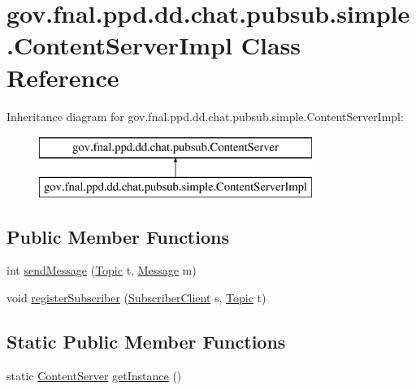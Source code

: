 \hypertarget{classgov_1_1fnal_1_1ppd_1_1dd_1_1chat_1_1pubsub_1_1simple_1_1ContentServerImpl}{\section{gov.\-fnal.\-ppd.\-dd.\-chat.\-pubsub.\-simple.\-Content\-Server\-Impl Class Reference}
\label{classgov_1_1fnal_1_1ppd_1_1dd_1_1chat_1_1pubsub_1_1simple_1_1ContentServerImpl}
}
Inheritance diagram for gov.\-fnal.\-ppd.\-dd.\-chat.\-pubsub.\-simple.\-Content\-Server\-Impl\-:\begin{figure}[H]
\begin{center}
\leavevmode
\includegraphics[height=2.000000cm]{classgov_1_1fnal_1_1ppd_1_1dd_1_1chat_1_1pubsub_1_1simple_1_1ContentServerImpl}
\end{center}
\end{figure}
\subsection*{Public Member Functions}
\begin{DoxyCompactItemize}
\item 
int \hyperlink{classgov_1_1fnal_1_1ppd_1_1dd_1_1chat_1_1pubsub_1_1simple_1_1ContentServerImpl_a8751b4e642ee674d78c127fa0ad41e60}{send\-Message} (\hyperlink{classgov_1_1fnal_1_1ppd_1_1dd_1_1chat_1_1pubsub_1_1Topic}{Topic} t, \hyperlink{interfacegov_1_1fnal_1_1ppd_1_1dd_1_1chat_1_1pubsub_1_1Message}{Message} m)
\item 
void \hyperlink{classgov_1_1fnal_1_1ppd_1_1dd_1_1chat_1_1pubsub_1_1simple_1_1ContentServerImpl_af5dfa68455616c62af8afc15010eda8d}{register\-Subscriber} (\hyperlink{classgov_1_1fnal_1_1ppd_1_1dd_1_1chat_1_1pubsub_1_1simple_1_1SubscriberClient}{Subscriber\-Client} s, \hyperlink{classgov_1_1fnal_1_1ppd_1_1dd_1_1chat_1_1pubsub_1_1Topic}{Topic} t)
\end{DoxyCompactItemize}
\subsection*{Static Public Member Functions}
\begin{DoxyCompactItemize}
\item 
static \hyperlink{interfacegov_1_1fnal_1_1ppd_1_1dd_1_1chat_1_1pubsub_1_1ContentServer}{Content\-Server} \hyperlink{classgov_1_1fnal_1_1ppd_1_1dd_1_1chat_1_1pubsub_1_1simple_1_1ContentServerImpl_a262658dc9943adf3be7634da0b8b5412}{get\-Instance} ()
\end{DoxyCompactItemize}


